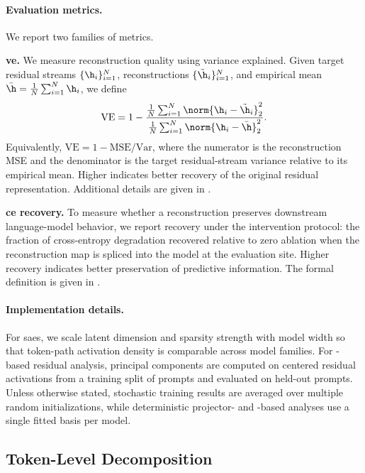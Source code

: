 \documentclass{article}
\begin{document}
\paragraph{Evaluation metrics.}
We report two families of metrics.

\textbf{\gls{ve}.}
We measure reconstruction quality using variance explained. Given target residual streams $\{\h_i\}_{i=1}^{N}$, reconstructions $\{\tilde{\h}_i\}_{i=1}^{N}$, and empirical mean $\bar{\h} = \frac{1}{N}\sum_{i=1}^{N}\h_i$, we define
\begin{equation}
  \mathrm{VE} = 1 - \frac{\frac{1}{N}\sum_{i=1}^{N} \norm{\h_i - \tilde{\h}_i}_2^2}{\frac{1}{N}\sum_{i=1}^{N} \norm{\h_i - \bar{\h}}_2^2}.
\end{equation}
Equivalently, $\mathrm{VE} = 1 - \mathrm{MSE}/\mathrm{Var}$, where the numerator is the reconstruction MSE and the denominator is the target residual-stream variance relative to its empirical mean. Higher  indicates better recovery of the original residual representation. Additional details are given in .

\textbf{\gls{ce} recovery.}
To measure whether a reconstruction preserves downstream language-model behavior, we report  recovery under the intervention protocol: the fraction of cross-entropy degradation recovered relative to zero ablation when the reconstruction map is spliced into the model at the evaluation site. Higher  recovery indicates better preservation of predictive information. The formal definition is given in .

\paragraph{Implementation details.}
For \glspl{sae}, we scale latent dimension and sparsity strength with model width so that token-path activation density is comparable across model families. For -based residual analysis, principal components are computed on centered residual activations from a training split of prompts and evaluated on held-out prompts. Unless otherwise stated, stochastic training results are averaged over multiple random initializations, while deterministic projector- and -based analyses use a single fitted basis per model.

\subsection{Token-Level Decomposition}
\label{subsec:token_decomp}
\end{document}
